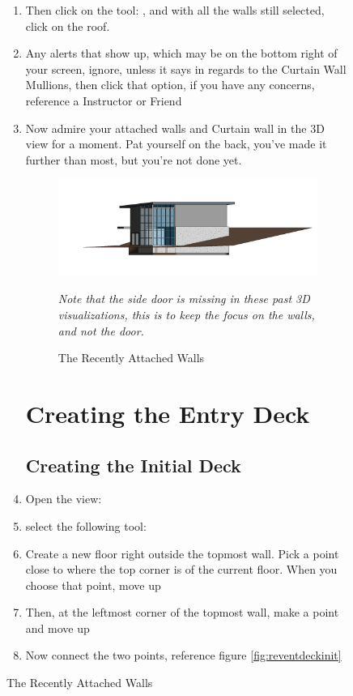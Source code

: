 \documentclass{tufte-book} %
\begin{document}
\begin{figure}
\begin{enumerate}
	\item Then click on the tool: , and with all the walls still selected, click on the roof.
	\item Any alerts that show up, which may be on the bottom right of your screen, ignore, unless it says  in regards to the Curtain Wall Mullions, then click that option, if you have any concerns, reference a Instructor or Friend
	\item Now admire your attached walls and Curtain wall in the 3D view for a moment. Pat yourself on the back, you've made it further than most, but you're not done yet.
	
	\begin{figure}
		\includegraphics[width=\linewidth]{revitattachfinal.png}
		\caption{The Recently Attached Walls}
		\emph{Note that the side door is missing in these past 3D visualizations, this is to keep the focus on the walls, and not the door.}
	\end{figure}
	

\section{Creating the Entry Deck}
	\subsection{Creating the Initial Deck}
		\item Open the view: 
		\item select the following tool: 
		\item Create a new floor right outside the topmost wall. Pick a point close to where the top corner is of the current floor. When you choose that point, move up 
		\item Then, at the leftmost corner of the topmost wall, make a point and move up 
		\item Now connect the two points, reference figure \ref{fig:reventdeckinit}
		

\end{enumerate}
\end{figure}
\end{document}
